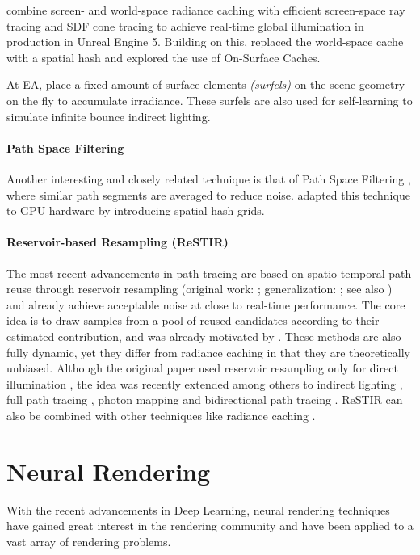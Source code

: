 \textcite{wright2021,wright2022} combine screen- and world-space radiance caching with efficient screen-space ray tracing and SDF cone tracing to achieve real-time global illumination in production in Unreal Engine 5.
Building on this, \textcite{boisse2023} replaced the world-space cache with a spatial hash and \textcite{tatzgern2024} explored the use of On-Surface Caches.

At EA, \textcite{stachowiak2018,halen2021,apers2024} place a fixed amount of surface elements \emph{(surfels)} on the scene geometry on the fly to accumulate irradiance.
These surfels are also used for self-learning to simulate infinite bounce indirect lighting.

\paragraph{Path Space Filtering}
Another interesting and closely related technique is that of Path Space Filtering , where similar path segments are averaged to reduce noise.
\textcite{binder2021} adapted this technique to GPU hardware by introducing spatial hash grids.

\paragraph{Reservoir-based Resampling (ReSTIR)}
The most recent advancements in path tracing are based on spatio-temporal path reuse through reservoir resampling (original work: \cite{bitterli2020}; generalization: \cite{lin2022}; see also \cite{wyman2023}) and already achieve acceptable noise at close to real-time performance.
The core idea is to draw samples from a pool of reused candidates according to their estimated contribution, and was already motivated by \textcite{talbot2005}.
These methods are also fully dynamic, yet they differ from radiance caching in that they are theoretically unbiased.
Although the original paper used reservoir resampling only for direct illumination , the idea was recently extended among others to indirect lighting , full path tracing , photon mapping  and bidirectional path tracing .
ReSTIR can also be combined with other techniques like radiance caching .

\section{Neural Rendering}
With the recent advancements in Deep Learning, neural rendering techniques have gained great interest in the rendering community and have been applied to a vast array of rendering problems.

